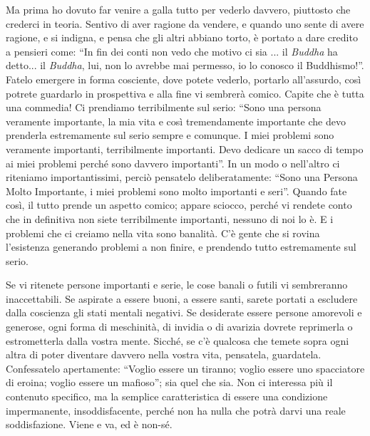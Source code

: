 Ma prima ho dovuto far venire a galla tutto per vederlo davvero,
piuttosto che crederci in teoria. Sentivo di aver ragione da vendere, e
quando uno sente di avere ragione, e si indigna, e pensa che gli altri
abbiano torto, è portato a dare credito a pensieri come: ``In fin dei
conti non vedo che motivo ci sia ... il \textit{Buddha} ha detto... il \textit{Buddha},
lui, non lo avrebbe mai permesso, io lo conosco il Buddhismo!''. Fatelo
emergere in forma cosciente, dove potete vederlo, portarlo all'assurdo,
così potrete guardarlo in prospettiva e alla fine vi sembrerà comico.
Capite che è tutta una commedia! Ci prendiamo terribilmente sul serio:
``Sono una persona veramente importante, la mia vita e così tremendamente
importante che devo prenderla estremamente sul serio sempre e comunque.
I miei problemi sono veramente importanti, terribilmente importanti.
Devo dedicare un sacco di tempo ai miei problemi perché sono davvero
importanti''. In un modo o nell'altro ci riteniamo importantissimi,
perciò pensatelo deliberatamente: ``Sono una Persona Molto Importante, i
miei problemi sono molto importanti e seri''. Quando fate così, il tutto
prende un aspetto comico; appare sciocco, perché vi rendete conto che in
definitiva non siete terribilmente importanti, nessuno di noi lo è. E i
problemi che ci creiamo nella vita sono banalità. C'è gente che si
rovina l'esistenza generando problemi a non finire, e prendendo tutto
estremamente sul serio.

Se vi ritenete persone importanti e serie, le cose banali o futili vi
sembreranno inaccettabili. Se aspirate a essere buoni, a essere santi,
sarete portati a escludere dalla coscienza gli stati mentali negativi.
Se desiderate essere persone amorevoli e generose, ogni forma di
meschinità, di invidia o di avarizia dovrete reprimerla o estrometterla
dalla vostra mente. Sicché, se c'è qualcosa che temete sopra ogni altra
di poter diventare davvero nella vostra vita, pensatela, guardatela.
Confessatelo apertamente: ``Voglio essere un tiranno; voglio essere uno
spacciatore di eroina; voglio essere un mafioso''; sia quel che sia. Non
ci interessa più il contenuto specifico, ma la semplice caratteristica
di essere una condizione impermanente, insoddisfacente, perché non ha
nulla che potrà darvi una reale soddisfazione. Viene e va, ed è non-sé.
